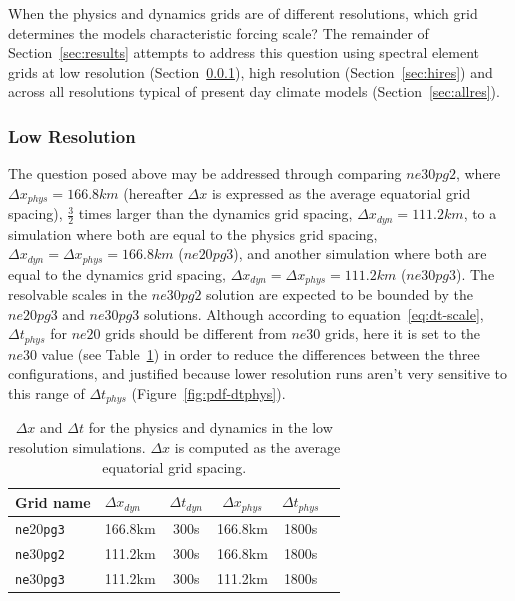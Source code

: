 \documentclass{agujournal}
\begin{document}
When the physics and dynamics grids are of different resolutions, which grid determines the models characteristic forcing scale? The remainder of Section~\ref{sec:results} attempts to address this question using spectral element grids at low resolution (Section~\ref{sec:lores}), high resolution (Section~\ref{sec:hires}) and across all resolutions typical of present day climate models (Section~\ref{sec:allres}).

\subsubsection{Low Resolution}\label{sec:lores}

The question posed above may be addressed through comparing $ne30pg2$, where $\Delta x_{phys} = 166.8km$ (hereafter $\Delta x$ is expressed as the average equatorial grid spacing), $\frac{3}{2}$ times larger than the dynamics grid spacing, $\Delta x_{dyn} = 111.2km$, to a simulation where both are equal to the physics grid spacing, $\Delta x_{dyn} = \Delta x_{phys} = 166.8 km$ ($ne20pg3$), and another simulation where both are equal to the dynamics grid spacing, $\Delta x_{dyn} = \Delta x_{phys} = 111.2 km$ ($ne30pg3$). The resolvable scales in the $ne30pg2$ solution are expected to be bounded by the $ne20pg3$ and $ne30pg3$ solutions. Although according to equation~\eqref{eq:dt-scale}, $\Delta t_{phys}$ for $ne20$ grids should be different from $ne30$ grids, here it is set to the $ne30$ value (see Table~\ref{table:grids-lo}) in order to reduce the differences between the three configurations, and justified because lower resolution runs aren't very sensitive to this range of $\Delta t_{phys}$ (Figure~\ref{fig:pdf-dtphys}).

 \begin{table}
 \caption{$\Delta x$ and $\Delta t$ for the physics and dynamics in the low resolution simulations. $\Delta x$ is computed as the average equatorial grid spacing.}
 \centering
 \begin{tabular}{llcccc}
 \hline
 Grid name & $\Delta x_{dyn}$  & $\Delta t_{dyn}$ & $\Delta x_{phys}$  & $\Delta t_{phys}$ \\
 \hline
   {\tt{ne}}20{\tt{pg3}}  & 166.8km & 300s  & 166.8km & 1800s \\
   {\tt{ne}}30{\tt{pg2}}  & 111.2km & 300s  & 166.8km & 1800s \\
   {\tt{ne}}30{\tt{pg3}}  & 111.2km & 300s  & 111.2km & 1800s \\
 \hline
 \end{tabular}
 \label{table:grids-lo}
 \end{table}
\end{document}
